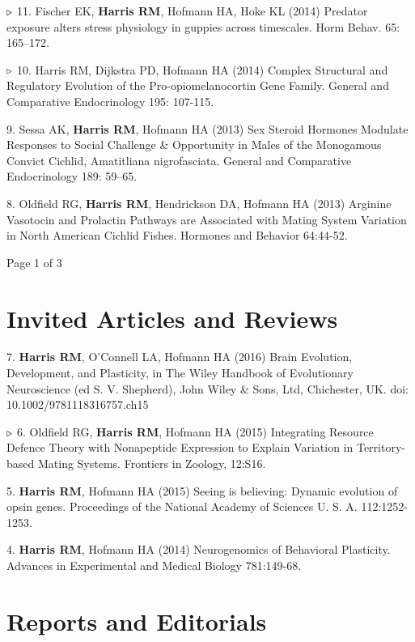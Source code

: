 \documentclass[margin,line]{resume}
\begin{document}
\begin{resume}
{\color{red} ${\bf \triangleright}$}
11. Fischer EK, {\bf Harris RM}, Hofmann HA, Hoke KL (2014) Predator exposure alters stress physiology in guppies across timescales. Horm Behav. 65: 165–172. 

{\color{red} ${\bf \triangleright}$}
10. Harris RM, Dijkstra PD, Hofmann HA (2014) Complex Structural and Regulatory Evolution of the Pro-opiomelanocortin Gene Family. General and Comparative Endocrinology 195: 107-115. 

9. Sessa AK, {\bf Harris RM}, Hofmann HA (2013) Sex Steroid Hormones Modulate Responses to Social Challenge \& Opportunity in Males of the Monogamous Convict Cichlid, Amatitliana nigrofasciata. General and Comparative Endocrinology 189: 59–65. 

8. Oldfield RG, {\bf Harris RM}, Hendrickson DA, Hofmann HA (2013) Arginine Vasotocin and Prolactin Pathways are Associated with Mating System Variation in North American Cichlid Fishes. Hormones and Behavior 64:44-52. 

\vspace{2mm}
{\centerline {Page 1 of 3}}
\newpage

\section{\mysidestyle Invited Articles and Reviews}

7. {\bf Harris RM}, O’Connell LA, Hofmann HA (2016) Brain Evolution, Development, and Plasticity, in The Wiley Handbook of Evolutionary Neuroscience (ed S. V. Shepherd), John Wiley \& Sons, Ltd, Chichester, UK. doi: 10.1002/9781118316757.ch15

{\color{red} ${\bf \triangleright}$}
6. 	Oldfield RG, {\bf Harris RM}, Hofmann HA (2015) Integrating Resource Defence Theory with Nonapeptide Expression to Explain Variation in Territory-based Mating Systems. Frontiers in Zoology, 12:S16. 

5.	{\bf Harris RM}, Hofmann HA (2015) Seeing is believing: Dynamic evolution of opsin genes. Proceedings of the National Academy of Sciences U. S. A. 112:1252-1253. 

4. 	{\bf Harris RM}, Hofmann HA (2014) Neurogenomics of Behavioral Plasticity. Advances in Experimental and Medical Biology 781:149-68. 

\section{\mysidestyle Reports and Editorials}


\end{resume}
\end{document}
